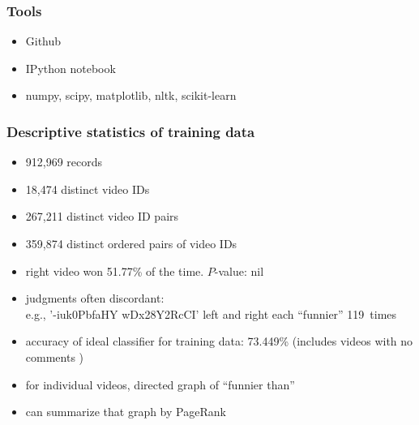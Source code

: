 \documentclass[fleqn]{beamer}
\begin{document}
\begin{frame}
\frametitle{Tools}
   \begin{itemize}
        \item Github
        \item IPython notebook
        \item numpy, scipy, matplotlib, nltk, scikit-learn
   \end{itemize}

\end{frame}

 \begin{frame}
\frametitle{Descriptive statistics of training data}
      \begin{itemize}
         \item 912,969 records
         \item 18,474 distinct video IDs
         \item 267,211 distinct video ID pairs
         \item 359,874 distinct ordered pairs of video IDs
         \item right video won 51.77\% of the time. $P$-value: nil
         \item judgments often discordant: \\
                  e.g., '-iuk0PbfaHY wDx28Y2RcCI' left and right each ``funnier'' 119~times
         \item accuracy of ideal classifier for training data: 73.449\% (includes videos with no comments )
         \item for individual videos, directed graph of ``funnier than''
         \item can summarize that graph by PageRank
     \end{itemize}

\end{frame}
\end{document}
